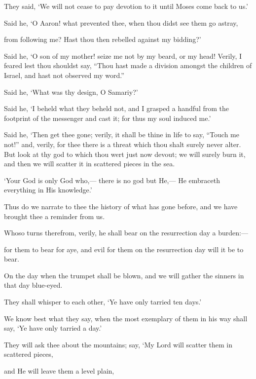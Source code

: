 \documentclass[fontsize=14pt, letterpaper, notitlepage, openany, DIV=12]{scrbook} %
\begin{document}
\noindent[20:91]
They said, `We will not cease to pay devotion to it until Moses come back to us.'

\noindent[20:92]
Said he, `O Aaron! what prevented thee, when thou didst see them go astray,

\noindent[20:93]
from following me? Hast thou then rebelled against my bidding?'

\noindent[20:94]
Said he, `O son of my mother! seize me not by my beard, or my head! Verily, I feared
lest thou shouldst say, ``Thou hast made a division amongst the children of Israel, and hast not
observed my word.''\hspace{0.1em}

\noindent[20:95]
Said he, `What was thy design, O Samariy?'

\noindent[20:96]
Said he, `I beheld what they beheld not, and I grasped a handful from the footprint of the
messenger and cast it; for thus my soul induced me.'

\noindent[20:97]
Said he, `Then get thee gone; verily, it shall be thine in life to say, ``Touch me not!'' and,
verily, for thee there is a threat which thou shalt surely never alter. But look at thy god to which
thou wert just now devout; we will surely burn it, and then we will scatter it in scattered pieces in
the sea.

\noindent[20:98]
`Your God is only God who,--- there is no god but He,--- He embraceth everything in His
knowledge.'

\noindent[20:99]
Thus do we narrate to thee the history of what has gone before, and we have brought thee
a reminder from us.

\noindent[20:100]
Whoso turns therefrom, verily, he shall bear on the resurrection day a burden:---

\noindent[20:101]
for them to bear for aye, and evil for them on the resurrection day will it be to bear.

\noindent[20:102]
On the day when the trumpet shall be blown, and we will gather the sinners in that day
blue-eyed.

\noindent[20:103]
They shall whisper to each other, `Ye have only tarried ten days.'

\noindent[20:104]
We know best what they say, when the most exemplary of them in his way shall say, `Ye
have only tarried a day.'

\noindent[20:105]
They will ask thee about the mountains; say, `My Lord will scatter them in scattered
pieces,

\noindent[20:106]
and He will leave them a level plain,
\end{document}
